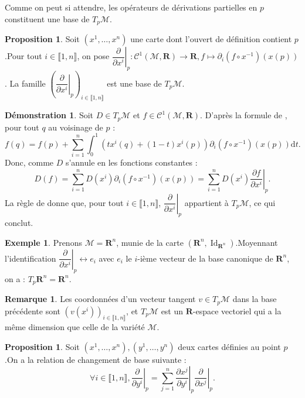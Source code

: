 \documentclass[12pt,a4paper]{article}
\DeclareMathOperator{\Id}{Id}
\theoremstyle{definition}
\newtheorem{prop}[thm]{Proposition}
\newtheorem{ex}[thm]{Exemple}
\newtheorem{rqe}[thm]{Remarque}
\newtheorem*{dem}{Démonstration}
\begin{document}
Comme on peut si attendre, les opérateurs de dérivations partielles en $p$ constituent une base de $T_p\mathcal{M}$.
\begin{prop}
Soit $(x^1,\ldots,x^n)$ une carte dont l'ouvert de définition contient $p$.\newline Pour tout $i\in\llbracket 1,n\rrbracket$, on pose $\left.\dfrac{\partial}{\partial x^i}\right|_p:\mathcal{C}^1(\mathcal{M},\mathbf{R})\to\mathbf{R},f\mapsto\partial_i(f\circ x^{-1})(x(p))$.\newline
La famille $\left(\left.\dfrac{\partial}{\partial x^i}\right|_p\right)_{i\in\llbracket 1,n\rrbracket}$ est une base de $T_p\mathcal{M}$.
\end{prop}
\begin{dem}
Soit $D\in T_p\mathcal{M}$ et $f\in\mathcal{C}^1(\mathcal{M},\mathbf{R})$. D'après la formule de , pour tout $q$ au voisinage de $p$ :
$$
f(q)=f(p)+\sum\limits_{i=1}^n\int_{0}^1(tx^i(q)+(1-t)x^i(p))\partial_i(f\circ x^{-1})(x(p))\mathrm{d}t.
$$
Donc, comme $D$ s'annule en les fonctions constantes :
$$
D(f)=\sum\limits_{i=1}^nD(x^i)\partial_i(f\circ x^{-1})(x(p))=\sum\limits_{i=1}^nD(x^i)\left.\dfrac{\partial f}{\partial x^i}\right|_p.
$$
La règle de  donne que, pour tout $i\in\llbracket 1,n\rrbracket$, $\left.\dfrac{\partial}{\partial x^i}\right|_p$ appartient à $T_p\mathcal{M}$, ce qui conclut.
\end{dem}
\begin{ex}
Prenons $\mathcal{M}=\mathbf{R}^n$, munie de la carte $(\mathbf{R}^n,\Id_{\mathbf{R}^n})$.\newline Moyennant l'identification $\left.\dfrac{\partial}{\partial x^i}\right|_p\leftrightarrow e_i$ avec $e_i$ le $i$-ième vecteur de la base canonique de $\mathbf{R}^n$, on a : $T_p\mathbf{R}^n=\mathbf{R}^n$.
\end{ex}
\newpage
\begin{rqe}
Les coordonnées d'un vecteur tangent $v\in T_p\mathcal{M}$ dans la base précédente sont $\left(v(x^i)\right)_{i\in\llbracket 1,n\rrbracket}$, et $T_p\mathcal{M}$ est un $\mathbf{R}$-espace vectoriel qui a la même dimension que celle de la variété $\mathcal{M}$.
\end{rqe}
\begin{prop}
Soit $(x^1,\ldots,x^n),(y^1,\ldots,y^n)$ deux cartes définies au point $p$.\newline On a la relation de changement de base suivante :
$$
\forall i\in\llbracket 1,n\rrbracket, \left.\dfrac{\partial}{\partial y^i}\right|_p=\sum\limits_{j=1}^n\left.\dfrac{\partial x^j}{\partial y^i}\right|_p\left.\dfrac{\partial}{\partial x^j}\right|_p.
$$
\end{prop}
\end{document}
